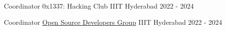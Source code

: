 
\begin{cventries}
  \cventry
    {Coordinator} %
    {0x1337: Hacking Club} %
    {IIIT Hyderabad} %
    {2022 - 2024} %
    {}
    
    
  \cventry
    {Coordinator} %
    {\href{https://osdg.iiit.ac.in/}{Open Source Developers Group}} %
    {IIIT Hyderabad} %
    {2022 - 2024} %
    {}
\end{cventries}
